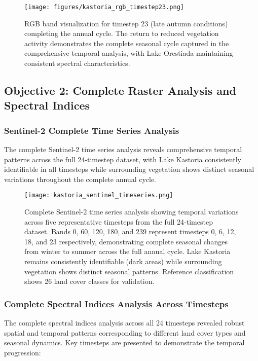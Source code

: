 \documentclass[a4paper,12pt]{article}
\begin{document}
\begin{figure}[H]
    \centering
    \texttt{[image: figures/kastoria\_rgb\_timestep23.png]}
    \caption{RGB band visualization for timestep 23 (late autumn conditions) completing the annual cycle. The return to reduced vegetation activity demonstrates the complete seasonal cycle captured in the comprehensive temporal analysis, with Lake Orestiada maintaining consistent spectral characteristics.}
    \label{fig:rgb_t23}
\end{figure}

\subsection{Objective 2: Complete Raster Analysis and Spectral Indices}

\subsubsection{Sentinel-2 Complete Time Series Analysis}

The complete Sentinel-2 time series analysis reveals comprehensive temporal patterns across
the full 24-timestep dataset, with Lake Kastoria consistently identifiable in all timesteps
while surrounding vegetation shows distinct seasonal variations throughout the complete annual cycle.

\begin{figure}[H]
    \centering
    \texttt{[image: kastoria\_sentinel\_timeseries.png]}
    \caption{Complete Sentinel-2 time series analysis showing temporal variations across five representative timesteps from the full 24-timestep dataset. Bands 0, 60, 120, 180, and 239 represent timesteps 0, 6, 12, 18, and 23 respectively, demonstrating complete seasonal changes from winter to summer across the full annual cycle. Lake Kastoria remains consistently identifiable (dark areas) while surrounding vegetation shows distinct seasonal patterns. Reference classification shows 26 land cover classes for validation.}
    \label{fig:sentinel_timeseries}
\end{figure}

\subsubsection{Complete Spectral Indices Analysis Across Timesteps}

The complete spectral indices analysis across all 24 timesteps revealed robust spatial and temporal patterns corresponding to different land cover types and seasonal dynamics. Key timesteps are presented to demonstrate the temporal progression:
\end{document}
